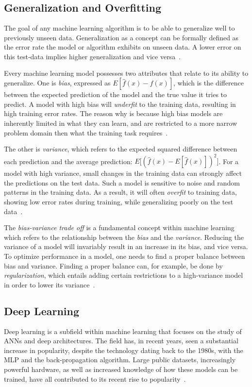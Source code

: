 \subsection{Generalization and Overfitting}
The goal of any machine learning algorithm is to be able to generalize well to previously unseen data. Generalization as a concept can be formally defined as the error rate the model or algorithm exhibits on unseen data. A lower error on this test-data implies higher generalization and vice versa~\cite{deeplearningbook}.

Every machine learning model possesses two attributes that relate to its ability to generalize. One is \textit{bias}, expressed as $E[\hat{f}(x) - f(x)]$, which is the difference between the expected prediction of the model and the true value it tries to predict. A model with high bias will \textit{underfit} to the training data, resulting in high training error rates. The reason why is because high bias models are inherently limited in what they can learn, and are restricted to a more narrow problem domain then what the training task requires~\cite{bishop}. 

The other is \textit{variance}, which refers to the expected squared difference between each prediction and the average prediction: $E\Big[(\hat{f}(x) - E[\hat{f}(x)])^2\Big]$. For a model with high variance, small changes in the training data can strongly affect the predictions on the test data. Such a model is sensitive to noise and random patterns in the training data. As a result, it will often \textit{overfit} to training data, showing low error rates during training, while generalizing poorly on the test data~\cite{bishop, deeplearningbook}.

The \textit{bias-variance trade off} is a fundamental concept within machine learning which refers to the relationship between the \textit{bias} and the \textit{variance}. Reducing the variance of a model will invariably result in an increase in its bias, and vice versa. To optimize performance in a model, one needs to find a proper balance between bias and variance. Finding a proper balance can, for example, be done by \textit{regularization}, which entails adding certain restrictions to a high-variance model in order to lower its variance~\cite{bishop}.

\subsection{Deep Learning}
Deep learning is a subfield within machine learning that focuses on the study of \glspl{ANN} and deep architectures. The field has, in recent years, seen a substantial increase in popularity, despite the technology dating back to the 1980s, with the \gls{MLP} and the back-propagation algorithm. Large public datasets, increasingly powerful hardware, as well as increased knowledge of how these models can be trained, have all contributed to its recent rise to popularity~\cite{deeplearningbook}.


